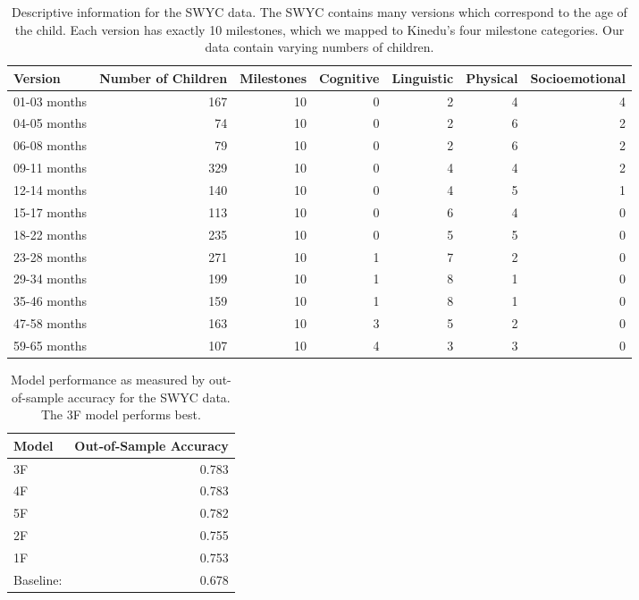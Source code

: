 \documentclass[9pt,twoside,lineno]{pnas-new}
\begin{document}
\begin{table}[ht]
\centering
\caption{\label{tab:swyc}Descriptive information for the SWYC data. The SWYC contains many versions which correspond to the age of the child. Each version has exactly 10 milestones, which we mapped to Kinedu's four milestone categories. Our data contain varying numbers of children.}
\begin{tabular}{lrrrrrr}
  \hline
Version & Number of Children & Milestones & Cognitive & Linguistic & Physical & Socioemotional \\
  \hline
  01-03 months & 167 &  10 &   0 &   2 &   4 &   4 \\
  04-05 months &  74 &  10 &   0 &   2 &   6 &   2 \\
  06-08 months &  79 &  10 &   0 &   2 &   6 &   2 \\
  09-11 months & 329 &  10 &   0 &   4 &   4 &   2 \\
  12-14 months & 140 &  10 &   0 &   4 &   5 &   1 \\
  15-17 months & 113 &  10 &   0 &   6 &   4 &   0 \\
  18-22 months & 235 &  10 &   0 &   5 &   5 &   0 \\
  23-28 months & 271 &  10 &   1 &   7 &   2 &   0 \\
  29-34 months & 199 &  10 &   1 &   8 &   1 &   0 \\
  35-46 months & 159 &  10 &   1 &   8 &   1 &   0 \\
  47-58 months & 163 &  10 &   3 &   5 &   2 &   0 \\
  59-65 months & 107 &  10 &   4 &   3 &   3 &   0 \\
   \hline
\end{tabular}
\end{table}

\begin{table}[ht]
\centering
\caption{\label{tab:swycresults}Model performance as measured by out-of-sample accuracy for the SWYC data. The 3F model performs best.}
\begin{tabular}{lr}
  \hline
Model & Out-of-Sample Accuracy \\
  \hline
  3F & 0.783 \\
  4F & 0.783 \\
  5F & 0.782 \\
  2F & 0.755 \\
  1F & 0.753 \\
  Baseline: & 0.678 \\
   \hline
\end{tabular}
\end{table}
\end{document}

